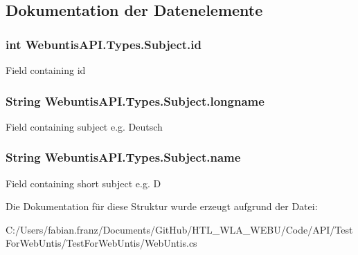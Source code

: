 \subsection{Dokumentation der Datenelemente}
\hypertarget{struct_webuntis_a_p_i_1_1_types_1_1_subject_ae9e339f8fc82608d03dcd222fc03e81a}{
\subsubsection[{id}]{\setlength{\rightskip}{0pt plus 5cm}int Webuntis\-A\-P\-I.\-Types.\-Subject.\-id}}\label{struct_webuntis_a_p_i_1_1_types_1_1_subject_ae9e339f8fc82608d03dcd222fc03e81a}
Field containing id \hypertarget{struct_webuntis_a_p_i_1_1_types_1_1_subject_a07f2f0280c83cc595fcd18f8c291d9a0}{
\subsubsection[{longname}]{\setlength{\rightskip}{0pt plus 5cm}String Webuntis\-A\-P\-I.\-Types.\-Subject.\-longname}}\label{struct_webuntis_a_p_i_1_1_types_1_1_subject_a07f2f0280c83cc595fcd18f8c291d9a0}
Field containing subject e.\-g. Deutsch \hypertarget{struct_webuntis_a_p_i_1_1_types_1_1_subject_a52c74e223123db5b7add56d0a6ad0708}{
\subsubsection[{name}]{\setlength{\rightskip}{0pt plus 5cm}String Webuntis\-A\-P\-I.\-Types.\-Subject.\-name}}\label{struct_webuntis_a_p_i_1_1_types_1_1_subject_a52c74e223123db5b7add56d0a6ad0708}
Field containing short subject e.\-g. D 

Die Dokumentation für diese Struktur wurde erzeugt aufgrund der Datei\-:\begin{DoxyCompactItemize}
\item 
C\-:/\-Users/fabian.\-franz/\-Documents/\-Git\-Hub/\-H\-T\-L\-\_\-\-W\-L\-A\-\_\-\-W\-E\-B\-U/\-Code/\-A\-P\-I/\-Test\-For\-Web\-Untis/\-Test\-For\-Web\-Untis/Web\-Untis.\-cs\end{DoxyCompactItemize}
